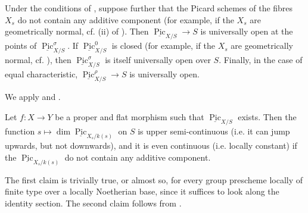 \begin{corollary}\label{fga3.vi-2-corollary}
    Under the conditions of , suppose further that the Picard schemes of the fibres $X_s$ do not contain any additive component (for example, if the $X_s$ are geometrically normal, cf. (ii) of ).
    Then $\underline{\operatorname{Pic}}_{X/S}\to S$ is universally open at the points of $\underline{\operatorname{Pic}}_{X/S}^\sigma$.
    If $\underline{\operatorname{Pic}}_{X/S}^0$ is closed (for example, if the $X_s$ are geometrically normal, cf. ), then $\underline{\operatorname{Pic}}_{X/S}^\sigma$ is itself universally open over $S$.
    Finally, in the case of equal characteristic, $\underline{\operatorname{Pic}}_{X/S}^\rho\to S$ is universally open.
\end{corollary}

\begin{cproof}
    We apply  and .
\end{cproof}

\begin{corollary}\label{fga3.vi-2-corollary-2.7}
    Let $f\colon X\to Y$ be a proper and flat morphism such that $\underline{\operatorname{Pic}}_{X/S}$ exists.
    Then the function $s\mapsto\dim\underline{\operatorname{Pic}}_{X_s/k(s)}$ on $S$ is upper semi-continuous (i.e. it can jump upwards, but not downwards), and it is even continuous (i.e. locally constant) if the $\underline{\operatorname{Pic}}_{X_s/k(s)}$ do not contain any additive component.
\end{corollary}

\begin{cproof}
    The first claim is trivially true, or almost so, for every group prescheme locally of finite type over a locally Noetherian base, since it suffices to look along the identity section.
    The second claim follows from .
\end{cproof}

